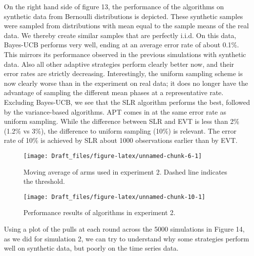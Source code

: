 \documentclass[11pt,]{article}
\begin{document}
On the right hand side of figure 13, the performance of the algorithms
on synthetic data from Bernoulli distributions is depicted. These
synthetic samples were sampled from distributions with mean equal to the
sample means of the real data. We thereby create similar samples that
are perfectly i.i.d. On this data, Bayes-UCB performs very well, ending
at an average error rate of about 0.1\%. This mirrors its performance
observed in the previous simulations with synthetic data. Also all other
adaptive strategies perform clearly better now, and their error rates
are strictly decreasing. Interestingly, the uniform sampling scheme is
now clearly worse than in the experiment on real data; it does no longer
have the advantage of sampling the different mean phases at a
representative rate. Excluding Bayes-UCB, we see that the SLR algorithm
performs the best, followed by the variance-based algorithms. APT comes
in at the same error rate as uniform sampling. While the difference
between SLR and EVT is less than 2\% (1.2\% vs 3\%), the difference to
uniform sampling (10\%) is relevant. The error rate of 10\% is achieved
by SLR about 1000 observations earlier than by EVT.

\begin{figure}

{\centering \texttt{[image: Draft\_files/figure-latex/unnamed-chunk-6-1]} 

}

\caption{Moving average of arms used in experiment 2. Dashed line indicates the threshold.}\label{fig:unnamed-chunk-6}
\end{figure}

\begin{figure}

{\centering \texttt{[image: Draft\_files/figure-latex/unnamed-chunk-10-1]} 

}

\caption{Performance results of algorithms in experiment 2.}\label{fig:unnamed-chunk-10}
\end{figure}

Using a plot of the pulls at each round across the 5000 simulations in
Figure 14, as we did for simulation 2, we can try to understand why some
strategies perform well on synthetic data, but poorly on the time series
data.
\end{document}
